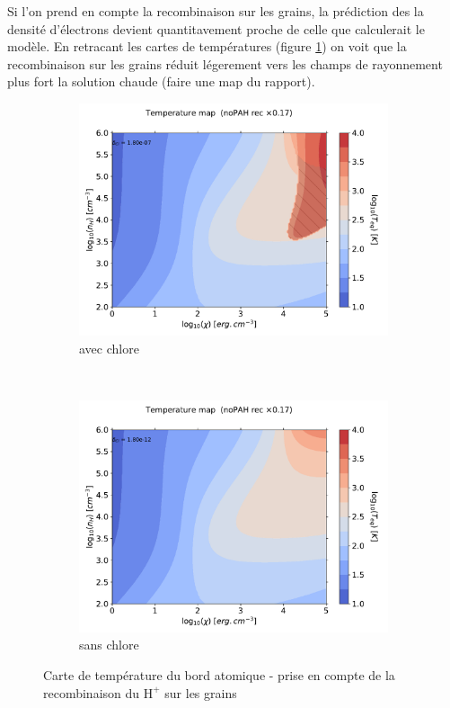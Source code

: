 Si l'on prend en compte la recombinaison sur les grains, la prédiction des la densité d'électrons devient quantitavement proche de celle que calculerait le modèle. En retracant les cartes de températures (figure \ref{fig:Cl:model:mapT:rec}) on voit que la recombinaison sur les grains réduit légerement vers les champs de rayonnement plus fort la solution chaude (faire une map du rapport).

\begin{figure}[htbp]
    \centering
    \begin{subfigure}[t]{0.45\textwidth} %
        \centering \includegraphics[trim = {0 0 0 1.5cm},clip,width=1\textwidth]{figure/Cl/model/mapG0nHTeq_m6p7_imp_noPAH_1p0PE_OI_CII_ggr_elecrec_lyman_OI.pdf}
        \caption{avec chlore}
    \end{subfigure}
    ~ 
    \begin{subfigure}[t]{0.45\textwidth}
        \centering \includegraphics[trim = {0 0 0 1.5cm},clip,width=1\textwidth]{figure/Cl/model/mapG0nHTeq_m11p7_imp_noPAH_1p0PE_OI_CII_ggr_elecrec_lyman_OI.pdf}
        \caption{sans chlore}
    \end{subfigure}
    \caption{Carte de température du bord atomique - prise en compte de la recombinaison du $\mathrm{H}^+$ sur les grains}
    \label{fig:Cl:model:mapT:rec}
\end{figure}


